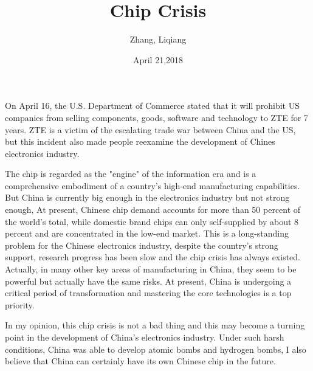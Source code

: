 \documentclass{article}
\author{Zhang, Liqiang}
\date{April 21,2018}
\title{Chip Crisis}
\begin{document}
\maketitle
\par
On April 16, the U.S. Department of Commerce stated that it will prohibit US companies from selling components, goods, software and technology to ZTE for 7 years. ZTE is a victim of the escalating trade war between China and the US, but this incident also made people reexamine the development of Chines electronics industry.
\par
The chip is regarded as the "engine" of the information era and is a comprehensive embodiment of a country's high-end manufacturing capabilities. But China is currently big enough in the electronics industry but not strong enough, At present, Chinese chip demand accounts for more than 50 percent of the world's total, while domestic brand chips can only self-supplied by about 8 percent and are concentrated in the low-end market. This is a long-standing problem for the Chinese electronics industry, despite the country's strong support, research progress has been slow and the chip crisis has always existed. Actually, in many other key areas of manufacturing in China, they seem to be powerful but actually have the same risks. At present, China is undergoing a critical period of transformation and mastering the core technologies is a top priority.
\par
In my opinion, this chip crisis is not a bad thing and this may become a turning point in the development of China's electronics industry. Under such harsh conditions, China was able to develop atomic bombs and hydrogen bombs, I also believe that China can certainly have its own Chinese chip in the future. 
\end{document}
